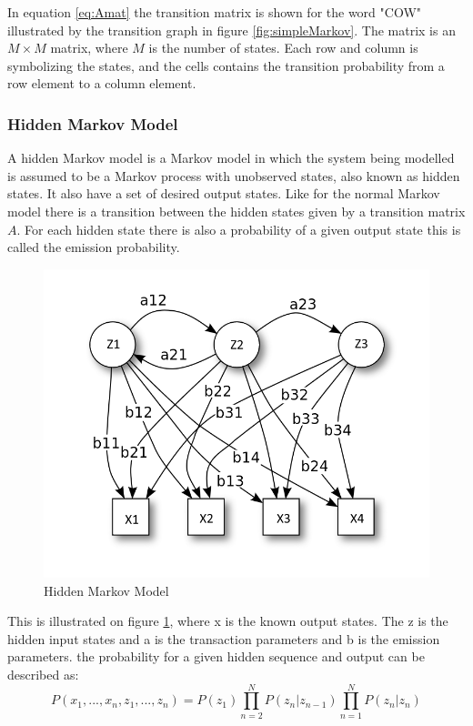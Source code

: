 In equation \ref{eq:Amat} the transition matrix is shown for the word "COW" illustrated by the transition graph in figure \ref{fig:simpleMarkov}. The matrix is an $M\times M$ matrix, where $M$ is the number of states. Each row and column is symbolizing the states, and the cells contains the transition probability from a row element to a column element.


\subsubsection{Hidden Markov Model}
A hidden Markov model is a Markov model in which the system being modelled is assumed to be a Markov process with unobserved states, also known as hidden states. It also have a set of desired output states. Like for the normal Markov model there is a transition between the hidden states given by a transition matrix $A$. For each hidden state there is also a probability of a given output state this is called the emission probability.

\begin{figure}[H]
\centering
\includegraphics[scale=0.5]{billeder/HiddenMarkovModel}
\caption{Hidden Markov Model}
\label{fig:HiddenMarkov}
\end{figure}

This is illustrated on figure \ref{fig:HiddenMarkov}, where x is the known output states. The z is the hidden input states and a is the transaction parameters and b is the emission parameters. the probability for a given hidden sequence and output can be described as: 
\begin{equation}
 P(x_1, ..., x_n, z_1, ..., z_n) = P(z_1) \prod\limits_{n=2}^N{P(z_n| z_{n-1})} 
\prod\limits_{n=1}^N{P(z_n| z_n)}
\end{equation}
 
